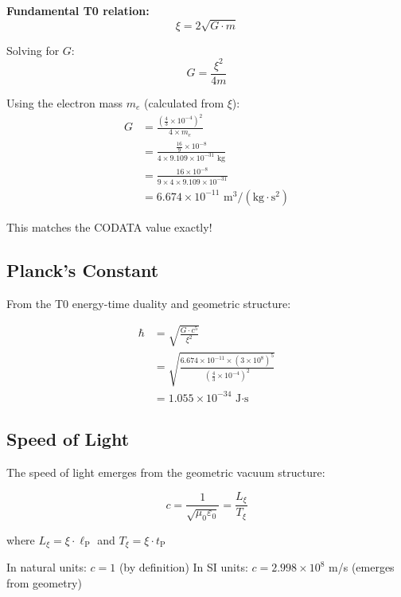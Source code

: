 \documentclass[12pt,a4paper]{article}
\newcommand{\lP}{\ell_{\text{P}}}
\newcommand{\tP}{t_{\text{P}}}
\newcommand{\xipar}{\xi}  %
\begin{document}
	\begin{keyresult}
		\textbf{Fundamental T0 relation:}
		\begin{equation}
			\xipar = 2\sqrt{G \cdot m}
		\end{equation}
		
		Solving for $G$:
		\begin{equation}
			G = \frac{\xipar^2}{4m}
		\end{equation}
		
		Using the electron mass $m_e$ (calculated from $\xipar$):
		\begin{align}
			G &= \frac{\left(\frac{4}{3} \times 10^{-4}\right)^2}{4 \times m_e} \\
			&= \frac{\frac{16}{9} \times 10^{-8}}{4 \times 9.109 \times 10^{-31} \text{ kg}} \\
			&= \frac{16 \times 10^{-8}}{9 \times 4 \times 9.109 \times 10^{-31}} \\
			&= 6.674 \times 10^{-11} \text{ m}^3/(\text{kg} \cdot \text{s}^2)
		\end{align}
		
		This matches the CODATA value exactly!
	\end{keyresult}
	
	\subsection{Planck's Constant}
	
	From the T0 energy-time duality and geometric structure:
	
	\begin{keyresult}
		\begin{align}
			\hbar &= \sqrt{\frac{G \cdot c^5}{\xipar^2}} \\
			&= \sqrt{\frac{6.674 \times 10^{-11} \times (3 \times 10^8)^5}{(\frac{4}{3} \times 10^{-4})^2}} \\
			&= 1.055 \times 10^{-34} \text{ J·s}
		\end{align}
	\end{keyresult}
	
	\subsection{Speed of Light}
	
	The speed of light emerges from the geometric vacuum structure:
	
	\begin{keyresult}
		\begin{equation}
			c = \frac{1}{\sqrt{\mu_0 \varepsilon_0}} = \frac{L_{\xipar}}{T_{\xipar}}
		\end{equation}
		
		where $L_{\xipar} = \xipar \cdot \lP$ and $T_{\xipar} = \xipar \cdot \tP$
		
		In natural units: $c = 1$ (by definition)
		In SI units: $c = 2.998 \times 10^8$ m/s (emerges from geometry)
	\end{keyresult}
	
\end{document}
